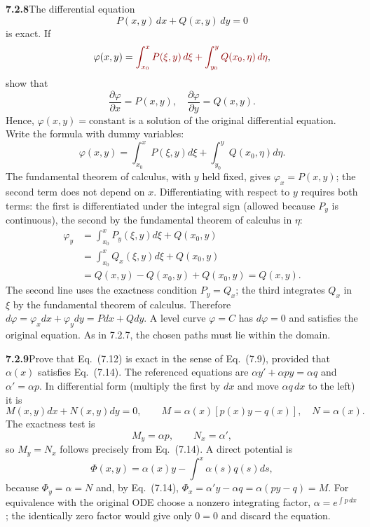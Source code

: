 \par\bigskip
\noindent\textbf{7.2.8}\quad The differential equation
\[
P(x,y)\,dx+Q(x,y)\,dy=0
\]
is exact.  If
\[
\varphi(x,y)=\erratum{\int_{x_{0}}^{x}P(\xi,y)\,d\xi+\int_{y_{0}}^{y}Q(x_{0},\eta)\,d\eta},
\]
show that
\[
\frac{\partial\varphi}{\partial x}=P(x,y),\quad
\frac{\partial\varphi}{\partial y}=Q(x,y).
\]
Hence, $\varphi(x,y)=\text{constant}$ is a solution of the original
differential equation.
\solution
Write the formula with dummy variables:
\[
\varphi(x,y)=\int_{x_0}^xP(\xi,y)d\xi
             +\int_{y_0}^yQ(x_0,\eta)d\eta.
\]
The fundamental theorem of calculus, with $y$ held fixed, gives
$\boxed{\varphi_x=P(x,y)}$; the second term does not depend on $x$.
Differentiating with respect to $y$ requires both terms: the first is
differentiated under the integral sign (allowed because $P_y$ is
continuous), the second by the fundamental theorem of calculus in $\eta$:
\begin{align*}
\varphi_y
&=\int_{x_0}^xP_y(\xi,y)d\xi+Q(x_0,y)\\
&=\int_{x_0}^xQ_x(\xi,y)d\xi+Q(x_0,y)\\
&=Q(x,y)-Q(x_0,y)+Q(x_0,y)=\boxed{Q(x,y)}.
\end{align*}
The second line uses the exactness condition $P_y=Q_x$; the third
integrates $Q_x$ in $\xi$ by the fundamental theorem of calculus.
Therefore $d\varphi=\varphi_xdx+\varphi_ydy=Pdx+Qdy$.
A level curve $\varphi=C$ has $d\varphi=0$ and satisfies the original
equation. As in 7.2.7, the chosen paths must lie within the domain.

\par\bigskip
\noindent\textbf{7.2.9}\quad Prove that Eq.~(7.12) is exact in the sense of
Eq.~(7.9), provided that $\alpha(x)$ satisfies Eq.~(7.14).
\solution
The referenced equations are
$\alpha y'+\alpha py=\alpha q$ and $\alpha'=\alpha p$.
In differential form (multiply the first by $dx$ and move $\alpha q\,dx$
to the left) it is
\[
M(x,y)dx+N(x,y)dy=0,\qquad
M=\alpha(x)[p(x)y-q(x)],\quad N=\alpha(x).
\]
The exactness test is
\[
M_y=\alpha p,\qquad N_x=\alpha',
\]
so $M_y=N_x$ follows precisely from Eq.~(7.14). A direct potential is
\[
\boxed{\Phi(x,y)=\alpha(x)y-\int^x\alpha(s)q(s)ds},
\]
because $\Phi_y=\alpha=N$ and, by Eq.~(7.14),
$\Phi_x=\alpha' y-\alpha q=\alpha(py-q)=M$.
For equivalence with the original ODE choose a nonzero integrating factor,
$\alpha=e^{\int p\,dx}$; the identically zero factor would give only
$0=0$ and discard the equation.

